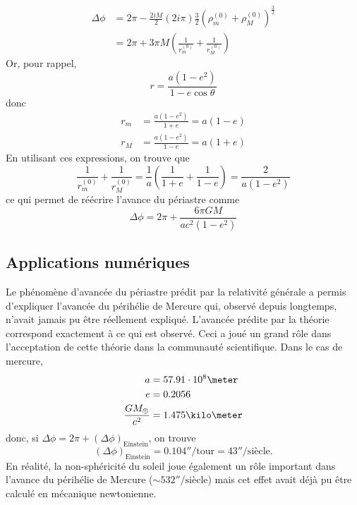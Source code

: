 \documentclass[a4paper,11pt]{report}
\begin{document}
            \begin{align}
                \Delta\phi &= 2\pi-\frac{2iM}{2}(2i\pi)\frac{3}{2}(\rho^{(0)}_m+\rho^{(0)}_M)^{\frac{3}{2}}\\
                &= 2\pi+3\pi M\left( \frac{1}{r^{(0)}_m}+\frac{1}{r^{(0)}_M} \right)
            \end{align}
            Or, pour rappel,
            \begin{equation}
                r = \frac{a(1-e^2)}{1-e\cos\theta}
            \end{equation}
            donc
            \begin{align}
                r_m &= \frac{a(1-e^2)}{1+e} = a(1-e)\\
                r_M &= \frac{a(1-e^2)}{1-e} = a(1+e)
            \end{align}
            En utilisant ces expressions, on trouve que
            \begin{equation}
                \frac{1}{r^{(0)}_m}+\frac{1}{r^{(0)}_M} = \frac{1}{a}\left( \frac{1}{1+e}+\frac{1}{1-e} \right) = \frac{2}{a(1-e^2)}
            \end{equation}
            ce qui permet de réécrire l'avance du périastre comme
            \begin{equation}
                \boxed{\Delta\phi = 2\pi+\frac{6\pi GM}{ac^2(1-e^2)}}
            \end{equation}
            
        \subsection{Applications numériques}
                
            Le phénomène d'avancée du périastre prédit par la relativité générale a permis d'expliquer l'avancée du périhélie de Mercure qui, observé depuis longtemps, n'avait jamais pu être réellement expliqué. L'avancée prédite par la théorie correspond exactement à ce qui est observé. Ceci a joué un grand rôle dans l'acceptation de cette théorie dans la communauté scientifique. Dans le cas de mercure,
            \begin{align}
                a &= 57.91\cdot10^8\meter\\
                e &= 0.2056\\
                \frac{GM_{\oplus}}{c^2} &= 1.475\kilo\meter
            \end{align}
            donc, si $\Delta\phi = 2\pi+(\Delta\phi)_{\text{Einstein}}$, on trouve
            \begin{equation}
                (\Delta\phi)_{\text{Einstein}} = 0.104''/\text{tour} = 43''/\text{siècle}.
            \end{equation}
            En réalité, la non-sphéricité du soleil joue également un rôle important dans l'avance du périhélie de Mercure ($\sim 532''/\text{siècle}$) mais cet effet avait déjà pu être calculé en mécanique newtonienne.\\
            
\end{document}
